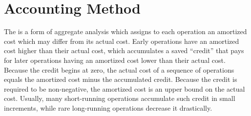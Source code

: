 \section{Accounting Method}

The  is a form of aggregate analysis which assigns to each operation an amortized cost which may differ from its actual cost. Early operations have an amortized cost higher than their actual cost, which accumulates a saved ``credit'' that pays for later operations having an amortized cost lower than their actual cost. Because the credit begins at zero, the actual cost of a sequence of operations equals the amortized cost minus the accumulated credit. Because the credit is required to be non-negative, the amortized cost is an upper bound on the actual cost. Usually, many short-running operations accumulate such credit in small increments, while rare long-running operations decrease it drastically.

